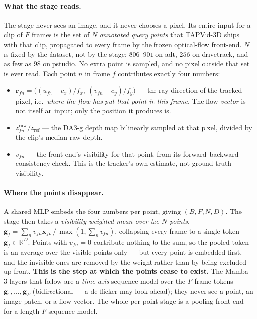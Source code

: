 \documentclass[11pt,a4paper]{article}
\begin{document}
\paragraph{What the stage reads.} The stage never sees an image, and it never chooses a pixel.
Its entire input for a clip of $F$ frames is the set of $N$ \emph{annotated query points} that
TAPVid-3D ships with that clip, propagated to every frame by the frozen optical-flow front-end.
$N$ is fixed by the dataset, not by the stage: $806$--$901$ on adt, $256$ on drivetrack, and as few
as $98$ on pstudio. No extra point is sampled, and no pixel outside that set is ever read. Each
point $n$ in frame $f$ contributes exactly four numbers:
\begin{itemize}
  \item $\mathbf{r}_{fn}=\big((u_{fn}-c_x)/f_x,\ (v_{fn}-c_y)/f_y\big)$ --- the ray direction of the
        tracked pixel, i.e.\ \emph{where the flow has put that point in this frame}. The flow
        \emph{vector} is not itself an input; only the position it produces is.
  \item $z^{\text{raw}}_{fn}/z_{\text{ref}}$ --- the DA3-g depth map bilinearly sampled at that
        pixel, divided by the clip's median raw depth.
  \item $v_{fn}$ --- the front-end's visibility for that point, from its forward--backward
        consistency check. This is the tracker's own estimate, not ground-truth visibility.
\end{itemize}

\paragraph{Where the points disappear.} A shared MLP embeds the four numbers per point, giving
$(B,F,N,D)$. The stage then takes a \emph{visibility-weighted mean over the $N$ points},
$\mathbf{g}_f=\sum_n v_{fn}\mathbf{x}_{fn}\,/\,\max(1,\sum_n v_{fn})$, collapsing every frame to a
single token $\mathbf{g}_f\in\mathbb{R}^{D}$. Points with $v_{fn}=0$ contribute nothing to the sum,
so the pooled token is an average over the visible points only --- but every point is embedded
first, and the invisible ones are removed by the weight rather than by being excluded up front.
\textbf{This is the step at which the points cease to exist.} The Mamba-3 layers that follow are a
\emph{time-axis} sequence model over the $F$ frame tokens $\mathbf{g}_1,\dots,\mathbf{g}_F$
(bidirectional --- a de-flicker may look ahead); they never see a point, an image patch, or a flow
vector. The whole per-point stage is a pooling front-end for a length-$F$ sequence model.
\end{document}
